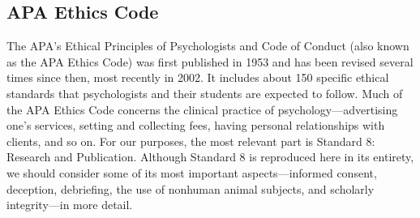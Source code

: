 \subsection{APA Ethics Code}


The APA's Ethical Principles of Psychologists and Code of Conduct (also known as the APA Ethics Code)
was first published in 1953 and has been revised several times since then, most recently in 2002. It includes about 150 specific ethical standards that psychologists and their students are expected to follow. Much of the APA Ethics Code concerns the clinical practice of psychology---advertising one's services, setting and collecting fees, having personal relationships with clients, and so on. For our purposes, the most relevant part is Standard 8: Research and Publication. Although Standard 8 is reproduced here in its entirety, we should consider some of its most important aspects---informed consent, deception, debriefing, the use of nonhuman animal subjects, and scholarly integrity---in more detail.


\newpage

